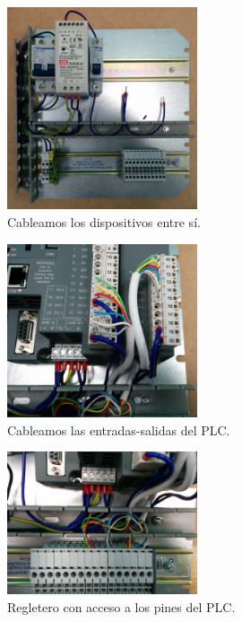     \begin{figure}[H]
            \centering
            \includegraphics[width=0.5\textwidth]{images/cuadro/IMG_20150313_182301.jpg}
            \caption{Cableamos los dispositivos entre sí.}
            \label{fig:cuad_montaje4}
    \end{figure}
       \begin{figure}[H]
            \centering
            \includegraphics[width=0.5\textwidth]{images/cuadro/IMG_20150331_113600.jpg}
            \caption{Cableamos las entradas-salidas del PLC.}
            \label{fig:cuad_montaje5}
    \end{figure}
    \begin{figure}[H]
            \centering
            \includegraphics[width=0.5\textwidth]{images/cuadro/IMG_20150331_113607.jpg}
            \caption{Regletero con acceso a los pines del PLC.}
            \label{fig:cuad_montaje6}
    \end{figure}
